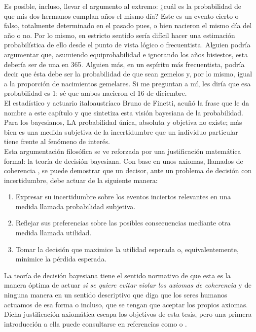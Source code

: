 	Es posible, incluso, llevar el argumento al extremo: ¿cuál es la probabilidad de que mis dos hermanos cumplan años el mismo día? Este es un evento cierto o falso, totalmente determinado en el pasado pues, o bien nacieron el mismo día del año o no. Por lo mismo, en estricto sentido sería difícil hacer una estimación probabilística de ello desde el punto de vista lógico o frecuentista. Alguien podría argumentar que, asumiendo equiprobabilidad e ignorando los años bisiestos, esta debería ser de una en 365. Alguien más, en un espíritu más frecuentista, podría decir que ésta debe ser la probabilidad de que sean gemelos y, por lo mismo, igual a la proporción de nacimientos gemelares. Si me preguntan a mí, les diría que esa probabilidad es 1: sé que ambos nacieron el 16 de diciembre.\\	
	
	El estadístico y actuario italoaustríaco Bruno de Finetti, acuñó la frase que le da nombre a este capítulo y que sintetiza esta visión bayesiana de la probabilidad. Para los bayesianos, LA probabilidad única, absoluta y objetiva no existe; más bien es una medida subjetiva de la incertidumbre que un individuo particular tiene frente al fenómeno de interés.\\ 
	
	
	Esta argumentación filosófica se ve reforzada por una justificación matemática formal: la teoría de decisión bayesiana. Con base en unos axiomas, llamados de coherencia , se puede demostrar que un decisor, ante un problema de decisión con incertidumbre, debe actuar de la siguiente manera:

\begin{enumerate}
\item Expresar su incertidumbre sobre los eventos inciertos relevantes en una medida llamada probabilidad subjetiva.
\item Reflejar sus preferencias sobre las posibles consecuencias mediante otra medida llamada utilidad. 
\item Tomar la decisión que maximice la utilidad esperada o, equivalentemente, minimice la pérdida esperada. 
\end{enumerate}   
	
La teoría de decisión bayesiana tiene el sentido normativo de que esta es la manera óptima de actuar \textit{si se quiere evitar violar los axiomas de coherencia} y de ninguna manera en un sentido descriptivo que diga que los seres humanos actuamos de esa forma o incluso, que se tengan que aceptar los propios axiomas. Dicha justificación axiomática escapa los objetivos de esta tesis, pero una primera introducción a ella puede consultarse en referencias como \textcite{Mendoza11} o \textcite{Bernardo81}.\\

